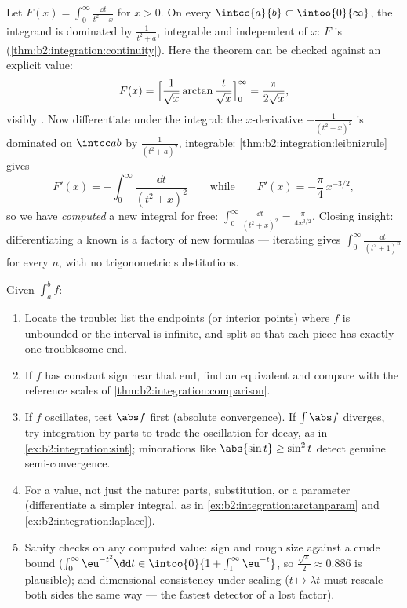 \begin{example}\label{ex:b2:integration:arctanparam}
Let $F(x) = \displaystyle\int_0^\infty \frac{\dd t}{t^2 + x}$
for $x > 0$. On every $\intcc{a}{b} \subset \intoo{0}{\infty}$,
the integrand is dominated by $\frac{1}{t^2 + a}$, integrable
and independent of $x$: $F$ is 
(\cref{thm:b2:integration:continuity}). Here the theorem can be
checked against an explicit value:
\[
F(x) = \Bigl[\frac{1}{\sqrt x}\arctan\frac{t}{\sqrt
x}\Bigr]_0^\infty = \frac{\pi}{2\sqrt x} ,
\]
visibly . Now differentiate under the integral: the
$x$-derivative $-\frac{1}{(t^2+x)^2}$ is dominated on
$\intcc ab$ by $\frac{1}{(t^2+a)^2}$, integrable:
\cref{thm:b2:integration:leibnizrule} gives
\[
F'(x) = -\int_0^\infty \frac{\dd t}{(t^2 + x)^2}
\qquad\text{while}\qquad
F'(x) = -\frac{\pi}{4}\,x^{-3/2} ,
\]
so we have \emph{computed} a new integral for free:
$\int_0^\infty\frac{\dd t}{(t^2+x)^2} = \frac{\pi}{4x^{3/2}}$.
Closing insight: differentiating a known  is a
factory of new formulas --- iterating gives
$\int_0^\infty\frac{\dd t}{(t^2+1)^n}$ for every $n$, with no
trigonometric substitutions.
\end{example}

\begin{method}\label{met:b2:integration:study}
Given $\int_a^b f$:
\begin{enumerate}
  \item Locate the trouble: list the endpoints (or interior
        points) where $f$ is unbounded or the interval is
        infinite, and split so that each piece has exactly one
        troublesome end.
  \item If $f$ has constant sign near that end, find an
        equivalent and compare with the reference scales of
        \cref{thm:b2:integration:comparison}.
  \item If $f$ oscillates, test $\abs f$ first (absolute
        convergence). If $\int\abs f$ diverges, try integration
        by parts to trade the oscillation for decay, as in
        \cref{ex:b2:integration:sint}; minorations like
        $\abs{\sin t} \geq \sin^2t$ detect genuine
        semi-convergence.
  \item For a value, not just the nature: parts, substitution,
        or a parameter (differentiate a simpler integral, as in
        \cref{ex:b2:integration:arctanparam} and
        \cref{ex:b2:integration:laplace}).
  \item Sanity checks on any computed value: sign and rough
        size against a crude bound ($\int_0^\infty
        \eu^{-t^2}\dd t \in \intoo{0}{1 + \int_1^\infty
        \eu^{-t}}$, so $\frac{\sqrt\pi}{2} \approx 0.886$ is
        plausible); and dimensional consistency under scaling
        ($t \mapsto \lambda t$ must rescale both sides the
        same way --- the fastest detector of a lost factor).
\end{enumerate}
\end{method}

